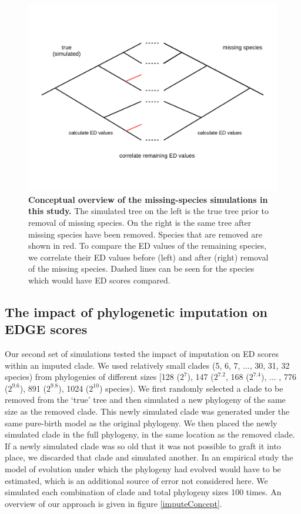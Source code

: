 \documentclass[10pt,english]{article}
\begin{document}
\begin{figure}[!ht]
  \center
  \includegraphics[width=.75\textwidth]{missingSpecies.png}
  \caption{\textbf{Conceptual overview of the missing-species simulations in this study.} The simulated tree on the left is the true tree
  prior to removal of missing species. On the right is the same tree after
  missing species have been removed. Species that are removed are shown in red.
  To compare the ED values of the remaining species, we correlate their ED values before (left) and after (right) removal of the missing species. Dashed lines can be seen for the species which would
  have ED scores compared.}
  \label{missingSpecies}
\end{figure}

\subsection*{The impact of phylogenetic imputation on EDGE scores}
Our second set of simulations tested the impact of imputation on ED scores
within an imputed clade. We used relatively small clades (5, 6, 7, ..., 30, 31,
32 species) from phylogenies of different sizes [128 ($2^7$), 147 ($2^{7.2}$,
168 ($2^{7.4}$), ... , 776 ($2^{9.6}$), 891 ($2^{9.8}$), 1024 ($2^{10}$)
species). We first randomly selected a clade to be removed from the ‘true' tree
and then simulated a new phylogeny of the same size as the removed clade. This
newly simulated clade was generated under the same pure-birth model as the
original phylogeny. We then placed the newly simulated clade in the full
phylogeny, in the same location as the removed clade. If a newly simulated clade
was so old that it was not possible to graft it into place, we discarded that
clade and simulated another. In an empirical study the model of evolution under
which the phylogeny had evolved would have to be estimated, which is an
additional source of error not considered here. We simulated each combination of
clade and total phylogeny sizes 100 times. An overview of our approach is given
in figure \ref{imputeConcept}. 
\end{document}
